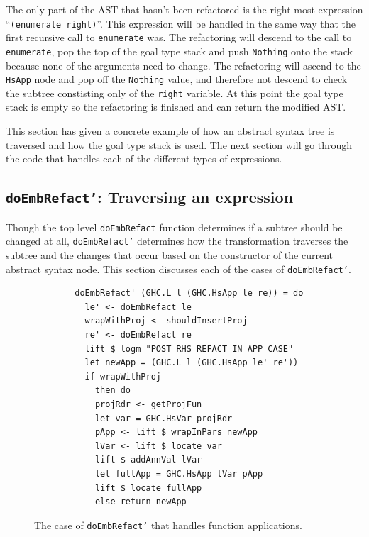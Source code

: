 The only part of the AST that hasn't been refactored is the right most expression ``\texttt{(enumerate right)}''. This expression will be handled in the same way that the first recursive call to \texttt{enumerate} was. The refactoring will descend to the call to \texttt{enumerate}, pop the top of the goal type stack and push \texttt{Nothing} onto the stack because none of the arguments need to change. The refactoring will ascend to the \texttt{HsApp} node and pop off the \texttt{Nothing} value, and therefore not descend to check the subtree constisting only of the \texttt{right} variable. At this point the goal type stack is empty so the refactoring is finished and can return the modified AST.

This section has given a concrete example of how an abstract syntax tree is traversed and how the goal type stack is used. The next section will go through the code that handles each of the different types of expressions.

\subsection{\texttt{doEmbRefact'}: Traversing an expression}

Though the top level \texttt{doEmbRefact} function determines if a subtree should be changed at all, \texttt{doEmbRefact'} determines how the transformation traverses the subtree and the changes that occur based on the constructor of the current abstract syntax node. This section discusses each of the cases of \texttt{doEmbRefact'}.

\begin{figure}[t]
\begin{lstlisting}
        doEmbRefact' (GHC.L l (GHC.HsApp le re)) = do
          le' <- doEmbRefact le
          wrapWithProj <- shouldInsertProj       
          re' <- doEmbRefact re
          lift $ logm "POST RHS REFACT IN APP CASE"
          let newApp = (GHC.L l (GHC.HsApp le' re'))
          if wrapWithProj
            then do
            projRdr <- getProjFun
            let var = GHC.HsVar projRdr
            pApp <- lift $ wrapInPars newApp
            lVar <- lift $ locate var
            lift $ addAnnVal lVar
            let fullApp = GHC.HsApp lVar pApp
            lift $ locate fullApp
            else return newApp
\end{lstlisting}
\caption{The case of \texttt{doEmbRefact'} that handles function applications.}
\label{embRefactApp}
\end{figure}

